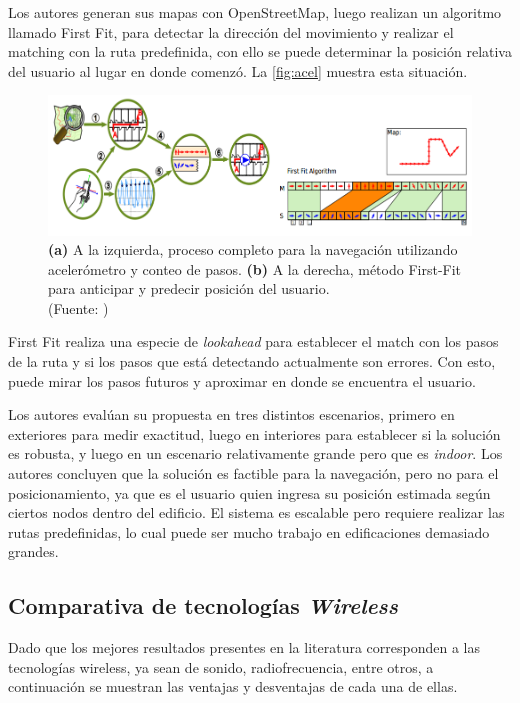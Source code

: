 Los autores generan sus mapas con OpenStreetMap, luego realizan un algoritmo llamado First Fit, para detectar la dirección del movimiento y realizar el matching con la ruta predefinida, con ello se puede determinar la posición relativa del usuario al lugar en donde comenzó. La \autoref{fig:acel} muestra esta situación.

\begin{figure}[ht!]
\centering
\includegraphics[width=.4\textwidth]{figures/acel.png}
\caption[abs]{\textbf{(a)} A la izquierda, proceso completo para la navegación utilizando acelerómetro y conteo de pasos. \textbf{(b)} A la derecha, método First-Fit para anticipar y predecir posición  del usuario.\\
{\scriptsize (Fuente: \citep{6071934, 5766963})}}
\label{fig:acel}
\end{figure}

First Fit realiza una especie de \textit{lookahead} para establecer el match con los pasos de la ruta y si los pasos que está detectando actualmente son errores. Con esto, puede mirar los pasos futuros y aproximar en donde se encuentra el usuario.

Los autores evalúan su propuesta en tres distintos escenarios, primero en exteriores para medir exactitud, luego en interiores para establecer si la solución es robusta, y luego en un escenario relativamente grande pero que es \textit{indoor}. Los autores concluyen que la solución es factible para la navegación, pero no para el posicionamiento, ya que es el usuario quien ingresa su posición estimada según ciertos nodos dentro del edificio. El sistema es escalable pero requiere realizar las rutas predefinidas, lo cual puede ser mucho trabajo en edificaciones demasiado grandes.

\subsection{Comparativa de tecnologías \textit{Wireless}}

Dado que los mejores resultados presentes en la literatura corresponden a las tecnologías wireless, ya sean de sonido, radiofrecuencia, entre otros, a continuación se muestran las ventajas y desventajas de cada una de ellas.

